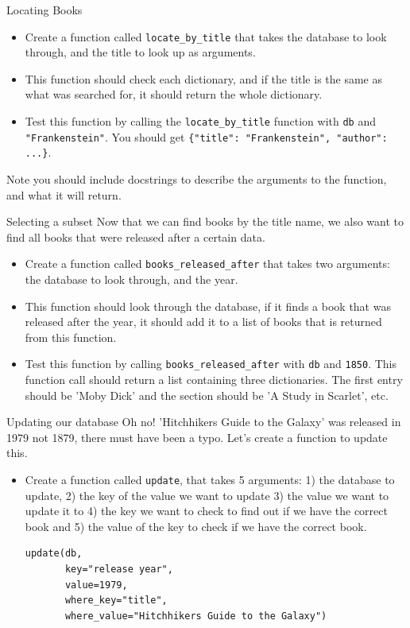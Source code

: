 \documentclass[10pt]{beamer}
\begin{document}
\begin{frame}[label={sec:org8f23dba},fragile]{Locating Books}
 \begin{itemize}
\item Create a function called \texttt{locate\_by\_title} that takes the database to look through,
and the title to look up as arguments.
\item This function should check each dictionary, and if the title is the same as what
was searched for, it should return the whole dictionary.
\item Test this function by calling the \texttt{locate\_by\_title} function with \texttt{db} and
\texttt{"Frankenstein"}. You should get \texttt{\{"title": "Frankenstein", "author": ...\}}.
\end{itemize}

\alert{Note} you should include docstrings to describe the arguments to the function, and
what it will return.
\end{frame}

\begin{frame}[label={sec:org4ba86ca},fragile]{Selecting a subset}
 Now that we can find books by the title name, we also want to find all books that
were released after a certain data.

\begin{itemize}
\item Create a function called \texttt{books\_released\_after} that takes two arguments: the
database to look through, and the year.
\item This function should look through the database, if it finds a book that was
released after the year, it should add it to a list of books that is returned from
this function.
\item Test this function by calling \texttt{books\_released\_after} with \texttt{db} and \texttt{1850}. This function
call should return a list containing three dictionaries. The first entry should be
'Moby Dick' and the section should be 'A Study in Scarlet', etc.
\end{itemize}
\end{frame}

\begin{frame}[label={sec:orgb53016c},fragile]{Updating our database}
 Oh no! 'Hitchhikers Guide to the Galaxy' was released in 1979 not 1879, there must
have been a typo. Let's create a function to update this.

\begin{itemize}
\item Create a function called \texttt{update}, that takes 5 arguments: 1) the database to
update, 2) the key of the value we want to update 3) the value we want to update it
to 4) the key we want to check to find out if we have the correct book and 5) the
value of the key to check if we have the correct book.

\begin{verbatim}
update(db,
       key="release year",
       value=1979,
       where_key="title",
       where_value="Hitchhikers Guide to the Galaxy")
\end{verbatim}
\end{itemize}
\end{frame}
\end{document}
